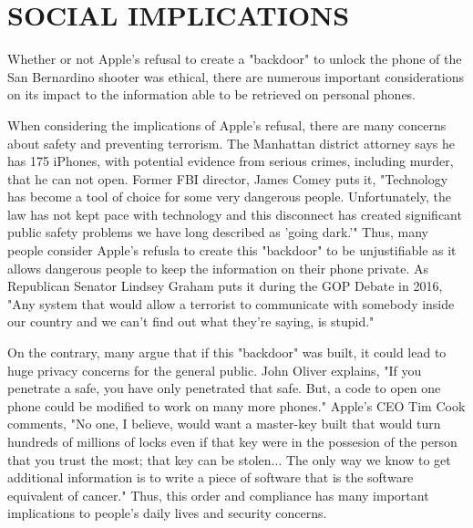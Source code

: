 \section{SOCIAL IMPLICATIONS}
Whether or not Apple's refusal to create a "backdoor" to unlock the phone of the San Bernardino shooter was ethical, there are numerous important considerations on its impact to the information able to be retrieved on personal phones.\par

When considering the implications of Apple's refusal, there are many concerns about safety and preventing terrorism. The Manhattan district attorney says he has 175 iPhones, with potential evidence from serious crimes, including murder, that he can not open. Former FBI director, James Comey puts it, "Technology has become a tool of choice for some very dangerous people. Unfortunately, the law has not kept pace with technology and this disconnect has created significant public safety problems we have long described as 'going dark.'"\cite{brookings} Thus, many people consider Apple's refusla to create this "backdoor" to be unjustifiable as it allows dangerous people to keep the information on their phone private. As Republican Senator Lindsey Graham puts it during the GOP Debate in 2016, "Any system that would allow a terrorist to communicate with somebody inside our country and we can't find out what they're saying, is stupid."\cite{CNN-GOP-Debate}\par

On the contrary, many argue that if this "backdoor" was built, it could lead to huge privacy concerns for the general public. John Oliver explains, "If you penetrate a safe, you have only penetrated that safe. But, a code to open one phone could be modified to work on many more phones."\cite{John-Oliver} Apple's CEO Tim Cook comments, "No one, I believe, would want a master-key built that would turn hundreds of millions of locks even if that key were in the possesion of the person that you trust the most; that key can be stolen... The only way we know to get additional information is to write a piece of software that is the software equivalent of cancer."\cite{ABC-TimCook} Thus, this order and compliance has many important implications to people's daily lives and security concerns. 